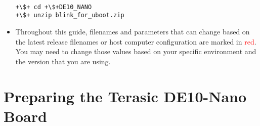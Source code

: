 \begin{flushleft}
\begin{itemize}

\begin{verbatim}

+\$+ cd +\$+DE10_NANO
+\$+ unzip blink_for_uboot.zip

\end{verbatim}

\item Throughout this guide, filenames and parameters that can change based on the latest release filenames or host computer configuration are marked in \textcolor{red}{red}.  You may need to change those values based on your specific environment and the version that you are using.

\end{itemize}

\end{flushleft}

\section*{Preparing the Terasic DE10-Nano Board}

